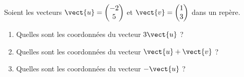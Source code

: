 
\begin{exercice}\label{exosmath-0059}

    Soient les vecteurs \( \vect{ u }=\begin{pmatrix}
        -2    \\ 
        5    
    \end{pmatrix}\) et \( \vect{ v }=\begin{pmatrix}
        1    \\ 
        3    
    \end{pmatrix}\) dans un repère.
    \begin{enumerate}
        \item
            Quelles sont les coordonnées du vecteur \( 3\vect{ u }\) ?
        \item
            Quelles sont les coordonnées du vecteur \( \vect{ u }+\vect{ v } \) ?
        \item
            Quelles sont les coordonnées du vecteur \( -\vect{ u }\) ?
    \end{enumerate}

\end{exercice}
